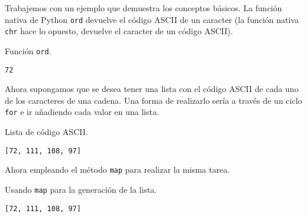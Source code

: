 Trabajemos con un ejemplo que demuestra los conceptos básicos. La
función nativa de Python \texttt{ord} devuelve el código ASCII de un
caracter (la función nativa \texttt{chr} hace lo opuesto, devuelve el
caracter de un código ASCII). \\

\begin{code} Función \texttt{ord}.
\begin{Shaded}
\begin{Highlighting}[]
\NormalTok{(}\NormalTok{)}
\end{Highlighting}
\end{Shaded}

\begin{verbatim}
72
\end{verbatim}
\end{code}

Ahora supongamos que se desea tener una lista con el código ASCII de
cada uno de los caracteres de una cadena. Una forma de realizarlo sería
a través de un ciclo \texttt{for} e ir añadiendo cada valor en una
lista. \\

\begin{code} Lista de código ASCII.

\begin{Shaded}
\begin{Highlighting}[]
\OperatorTok{=}\NormalTok{ []}
 \NormalTok{:}
\end{Highlighting}
\end{Shaded}

\begin{verbatim}
[72, 111, 108, 97]
\end{verbatim}
\end{code}

Ahora empleando el método \texttt{map} para realizar la misma tarea.\\

\begin{code} Usando \texttt{map} para la generación de la lista.

\begin{Shaded}
\begin{Highlighting}[]
\OperatorTok{=} \NormalTok{(}\NormalTok{(}\NormalTok{, }\NormalTok{))}
\end{Highlighting}
\end{Shaded}

\begin{verbatim}
[72, 111, 108, 97]
\end{verbatim}
\end{code}

